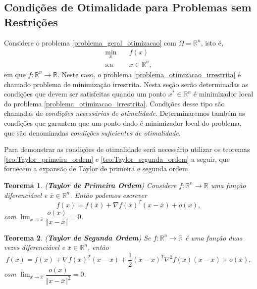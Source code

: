 \documentclass[12pt,a4paper]{scrartcl}
\def\RR{\mathds{R}}
\def\xbar{\bar{x}}
\newtheorem{teo}{Teorema}
\theoremstyle{definition}%
\begin{document}
\subsection{Condições de Otimalidade para Problemas sem Restrições} \label{subsection:irrestrito}

Considere o problema \eqref{problema_geral_otimizacao} com $\Omega = \RR^{n}$, isto é,
\[ \label{problema_otimizacao_irrestrita}
\begin{aligned}
\min_{x} & \quad f(x) \\
\text{s.a} & \quad x \in \RR^{n} ,
\end{aligned}
\]
em que $f:\RR^{n} \rightarrow \RR$. Neste caso, o problema \eqref{problema_otimizacao_irrestrita} é chamado problema de minimização irrestrita. Nesta seção serão determinadas as condições que devem ser satisfeitas quando um ponto $x^{*} \in \RR^{n}$ é minimizador local do problema \eqref{problema_otimizacao_irrestrita}. Condições desse tipo são chamadas de \emph{condições necessárias de otimalidade}. Determinaremos também as condições que garantem que um ponto dado é minimizador local do problema, que são denominadas \emph{condições suficientes de otimalidade}. 

Para demonstrar as condições de otimalidade será necessário utilizar os teoremas \eqref{teo:Taylor_primeira_ordem} e \eqref{teo:Taylor_segunda_ordem} a seguir, que fornecem a expansão de Taylor de primeira e segunda ordem.


\begin{teo}(\textbf{Taylor de Primeira Ordem}) {\cite[p.25]{Ademir2013}} \label{teo:Taylor_primeira_ordem}
Considere $f:\RR^{n} \rightarrow \RR$ uma função diferenciável e $\xbar \in \RR^{n}$. Então podemos escrever
\[
f(x) = f(\xbar) + \nabla f(\xbar)^{T}(x-\xbar) + o(x),
\]
com $\lim_{x \rightarrow \xbar}\dfrac{o(x)}{\Vert x-\xbar \Vert} = 0$.
\end{teo}

\begin{teo}(\textbf{Taylor de Segunda Ordem}) {\cite[p.26]{Ademir2013}} \label{teo:Taylor_segunda_ordem}
Se $f:\RR^{n} \rightarrow \RR$ é uma função duas vezes diferenciável e $\xbar \in \RR^{n}$, então
\[
f(x) = f(\xbar) + \nabla f(\xbar)^{T}(x-\xbar) + \dfrac{1}{2}(x-\xbar)^{T}\nabla^{2} f(\xbar)(x-\xbar) + o(x),
\] 
com $\lim_{x \rightarrow \xbar}\dfrac{o(x)}{\Vert x - \xbar \Vert^{2}} = 0$.
\end{teo}
\end{document}
